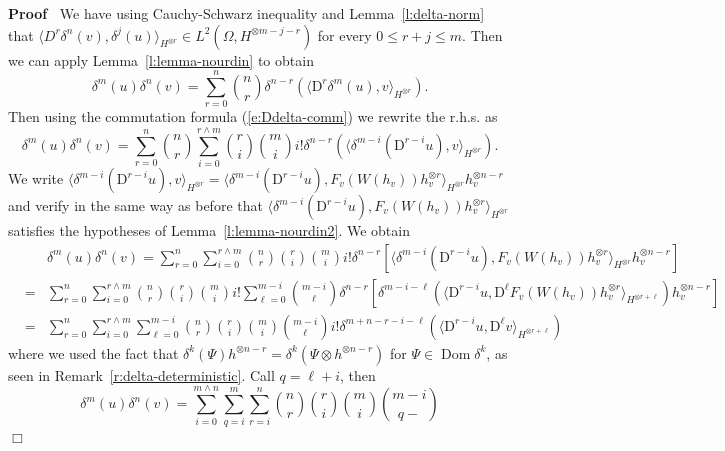 \documentclass[a4paper,11pt]{article}
\newcommand{\mathD}{\mathrm{D}}
\newcommand{\tmop}[1]{\ensuremath{\operatorname{#1}}}
\newenvironment{proof}{\noindent\textbf{Proof\ }}{\hspace*{\fill}$\Box$\medskip}
\begin{document}
\begin{proof}
  We have using Cauchy-Schwarz inequality and Lemma~\ref{l:delta-norm} that
  $\langle D^r \delta^n (v), \delta^j (u) \rangle_{H^{\otimes r}} \in L^2
  (\Omega, H^{\otimes m - j - r})$ for every $0 \leqslant r + j \leqslant m$.
  Then we can apply Lemma~\ref{l:lemma-nourdin} to obtain
  \[ \delta^m (u) \delta^n (v) = \sum_{r = 0}^n \binom{n}{r} \delta^{n - r}
     (\langle \mathD^r \delta^m (u), v \rangle_{H^{\otimes r}}) . \]
  Then using the commutation formula (\ref{e:Ddelta-comm}) we rewrite the
  r.h.s. as
  \[ \delta^m (u) \delta^n (v) = \sum_{r = 0}^n \binom{n}{r} \sum_{i = 0}^{r
     \wedge m} \binom{r}{i} \binom{m}{i} i! \delta^{n - r} (\langle \delta^{m
     - i} (\mathD^{r - i} u), v \rangle_{H^{\otimes r}}) . \]
  We write $\langle \delta^{m - i} (\mathD^{r - i} u), v \rangle_{H^{\otimes
  r}} = \langle \delta^{m - i} (\mathD^{r - i} u), F_v (W (h_v)) h^{\otimes
  r}_v \rangle_{H^{\otimes r}} h_v^{\otimes n - r}$ and verify in the same way
  as before that $\langle \delta^{m - i} (\mathD^{r - i} u), F_v (W (h_v))
  h^{\otimes r}_v \rangle_{H^{\otimes r}}$ satisfies the hypotheses of
  Lemma~\ref{l:lemma-nourdin2}. We obtain
   \begin{eqnarray*}
    & & \delta^m (u) \delta^n (v)  =  \sum_{r = 0}^n \sum_{i = 0}^{r \wedge m}
    \binom{n}{r} \binom{r}{i} \binom{m}{i} i! \delta^{n - r} [\langle
    \delta^{m - i} (\mathD^{r - i} u), F_v (W (h_v)) h^{\otimes r}_v
    \rangle_{H^{\otimes r}} h^{\otimes n - r}_v]\\
    & = & \sum_{r = 0}^n \sum_{i = 0}^{r \wedge m} \binom{n}{r} \binom{r}{i}
    \binom{m}{i} i! \sum_{\ell = 0}^{m - i} \binom{m - i}{\ell} \delta^{n - r}
    [\delta^{m - i - \ell} (\langle \mathD^{r - i} u, \mathD^{\ell} F_v (W
    (h_v)) h^{\otimes r}_v \rangle_{H^{\otimes r + \ell}}) h^{\otimes n -
    r}_v]\\
    & = & \sum_{r = 0}^n \sum_{i = 0}^{r \wedge m} \sum_{\ell = 0}^{m - i}
    \binom{n}{r} \binom{r}{i} \binom{m}{i} \binom{m - i}{\ell} i! \delta^{m +
    n - r - i - \ell} (\langle \mathD^{r - i} u, \mathD^{\ell} v
    \rangle_{H^{\otimes r + \ell}})
  \end{eqnarray*}
  where we used the fact that $\delta^k (\Psi) h^{\otimes n - r} = \delta^k
  (\Psi \otimes h^{\otimes n - r})$ for $\Psi \in \tmop{Dom} \delta^k$, as
  seen in Remark~\ref{r:delta-deterministic}. Call $q = \ell + i$, then
  \[ \delta^m (u) \delta^n (v) = \sum^{m \wedge n}_{i = 0} \sum_{q = i}^m
     \sum_{r = i}^n \binom{n}{r} \binom{r}{i} \binom{m}{i} \binom{m - i}{q -
}\]
\end{proof}
\end{document}
